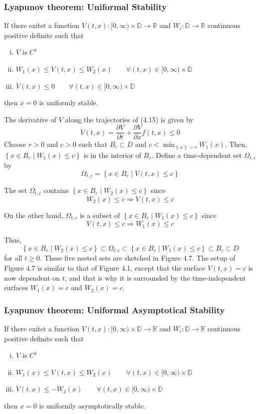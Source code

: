 \documentclass{article}
\newcommand{\mathbbD}{\mathbb{D}}
\newcommand{\mathbbR}{\mathbb{R}}
\begin{document}
\subsubsection{Lyapunov theorem: Uniformal Stability}
If there exitst a function $V(t,x):[0, \infty) \times \mathbbD \rightarrow
	\mathbbR$ and $W_i: \mathbb{D} \rightarrow \mathbb{R}$ continuous positive
definite such that
\begin{enumerate}[i)]
	\item $V \text{ is } C^1$
	\item $W_1(x) \leq V(t,x) \leq W_2(x) \qquad \forall (t,x) \in [0, \infty) \times \mathbb{D}$
	\item $\dot V(t,x) \leq 0 \qquad \forall (t,x) \in [0, \infty) \times \mathbb{D}$
\end{enumerate}
then $x=0$ is uniformly stable.
\begin{figure}[h]
	\centering
	\resizebox{0.45\textwidth}{!}{}
\end{figure}
\begin{frm-prf}
The derivative of $V$ along the trajectories of (4.15) is given by
$$
	\dot{V}(t, x)=\frac{\partial V}{\partial t}+\frac{\partial V}{\partial x} f(t, x) \leq 0
$$
Choose $r>0$ and $c>0$ such that $B_r \subset D$ and $c<\min _{\|x\|=r}
	W_1(x)$. Then, $\left\{x \in B_r \mid W_1(x) \leq c\right\}$ is in the interior
of $B_r$. Define a time-dependent set $\Omega_{t, c}$ by $$ \Omega_{t,
		c}=\left\{x \in B_r \mid V(t, x) \leq c\right\} $$

The set $\Omega_{t, c}$ contains $\left\{x \in B_r \mid W_2(x) \leq c\right\}$
since $$ W_2(x) \leq c \Rightarrow V(t, x) \leq c $$

On the other hand, $\Omega_{t, c}$ is a subset of $\left\{x \in B_r \mid W_1(x)
	\leq c\right\}$ since $$ V(t, x) \leq c \Rightarrow W_1(x) \leq c $$

Thus, $$ \left\{x \in B_r \mid W_2(x) \leq c\right\} \subset \Omega_{t, c}
	\subset\left\{x \in B_r \mid W_1(x) \leq c\right\} \subset B_r \subset D $$ for
all $t \geq 0$. These five nested sets are sketched in Figure 4.7. The setup of
Figure 4.7 is similar to that of Figure 4.1, except that the surface $V(t,
	x)=c$ is now dependent on $t$, and that is why it is surrounded by the
time-independent surfaces $W_1(x)=c$ and $W_2(x)=c$.
\end{frm-prf}
\subsubsection{Lyapunov theorem: Uniformal Asymptotical Stability}
If there exitst a function $V(t,x):[0, \infty) \times \mathbbD \rightarrow
	\mathbbR$ and $W_i: \mathbb{D} \rightarrow \mathbb{R}$ continuous positive
definite such that
\begin{enumerate}[i)]
	\item $V \text{ is } C^1$
	\item $W_1(x) \leq V(t,x) \leq W_2(x) \qquad \forall (t,x) \in [0, \infty) \times \mathbb{D}$
	\item $\dot V(t,x) \leq -W_3(x) \qquad \forall (t,x) \in [0, \infty) \times \mathbb{D}$
\end{enumerate}
then $x=0$ is uniformly asymptotically stable.
\end{document}
